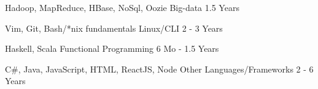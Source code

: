 

\begin{cventries}

  \cventry
    {Hadoop, MapReduce, HBase, NoSql, Oozie}
    {Big-data}
    {}
    {1.5 Years}
    {}

  \cventry
    {Vim, Git, Bash/*nix fundamentals}
    {Linux/CLI}
    {}
    {2 - 3 Years}
    {}

  \cventry
    {Haskell, Scala}
    {Functional Programming}
    {}
    {6 Mo - 1.5 Years}
    {}

  \cventry
    {C\#, Java, JavaScript, HTML, ReactJS, Node}
    {Other Languages/Frameworks}
    {}
    {2 - 6 Years}
    {}

\end{cventries}
